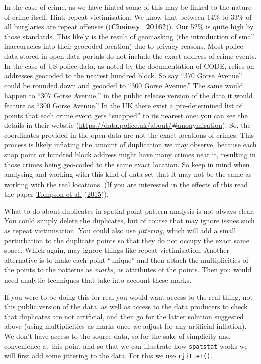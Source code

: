 \documentclass[
  krantz2]{krantz}
\begin{document}
In the case of crime, as we have hinted some of this may be linked to the nature of crime itself. Hint: repeat victimisation. We know that between 14\% to 33\% of all burglaries are repeat offenses ((\protect\hyperlink{ref-Chainey_2016}{\textbf{Chainey\_2016?}})). Our 52\% is quite high by those standards. This likely is the result of geomasking (the introduction of small inaccuracies into their geocoded location) due to privacy reasons. Most police data stored in open data portals do not include the exact address of crime events. In the case of US police data, as noted by the documentation of CODE, relies on addresses geocoded to the nearest hundred block. So say ``370 Gorse Avenue'' could be rounded down and geooded to ``300 Gorse Avenue.'' The same would happen to ``307 Gorse Avenue,'' in the public release version of the data it would feature as ``300 Gorse Avenue.'' In the UK there exist a pre-determined list of points that each crime event gets ``snapped'' to its nearest one: you can see the details in their webstie (\url{https://data.police.uk/about/\#anonymisation}). So, the coordinates provided in the open data are not the exact locations of crimes. This process is likely inflating the amount of duplication we may observe, because each snap point or hundred block address might have many crimes near it, resulting in those crimes being geo-coded to the same exact location. So keep in mind when analysing and working with this kind of data set that it may not be the same as working with the real locations. (If you are interested in the effects of this read the paper \protect\hyperlink{ref-Tompson_2015}{Tompson et al.} (\protect\hyperlink{ref-Tompson_2015}{2015})).

What to do about duplicates in spatial point pattern analysis is not always clear. You could simply delete the duplicates, but of course that may ignore issues such as repeat victimisation. You could also use \emph{jittering}, which will add a small perturbation to the duplicate points so that they do not occupy the exact same space. Which again, may ignore things like repeat victimisation. Another alternative is to make each point ``unique'' and then attach the multiplicities of the points to the patterns as \emph{marks}, as attributes of the points. Then you would need analytic techniques that take into account these marks.

If you were to be doing this for real you would want access to the real thing, not this public version of the data, as well as access to the data producers to check that duplicates are not artificial, and then go for the latter solution suggested above (using multiplicities as marks once we adjust for any artificial inflation). We don't have access to the source data, so for the sake of simplicity and convenience at this point and so that we can illustrate how \texttt{spatstat} works we will first add some jittering to the data. For this we use \texttt{rjitter()}.
\end{document}
